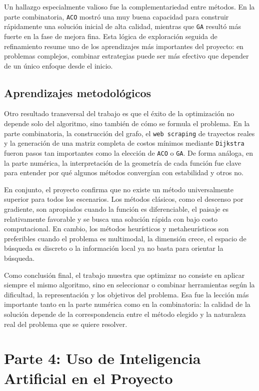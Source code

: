 \documentclass[
  12pt,
  letterpaper,
  DIV=11,
  numbers=noendperiod]{scrartcl}
\begin{document}
Un hallazgo especialmente valioso fue la complementariedad entre
métodos. En la parte combinatoria, \texttt{ACO} mostró una muy buena
capacidad para construir rápidamente una solución inicial de alta
calidad, mientras que \texttt{GA} resultó más fuerte en la fase de
mejora fina. Esta lógica de exploración seguida de refinamiento resume
uno de los aprendizajes más importantes del proyecto: en problemas
complejos, combinar estrategias puede ser más efectivo que depender de
un único enfoque desde el inicio.

\subsection{Aprendizajes
metodológicos}\label{aprendizajes-metodoluxf3gicos}

Otro resultado transversal del trabajo es que el éxito de la
optimización no depende solo del algoritmo, sino también de cómo se
formula el problema. En la parte combinatoria, la construcción del
grafo, el \texttt{web\ scraping} de trayectos reales y la generación de
una matriz completa de costos mínimos mediante \texttt{Dijkstra} fueron
pasos tan importantes como la elección de \texttt{ACO} o \texttt{GA}. De
forma análoga, en la parte numérica, la interpretación de la geometría
de cada función fue clave para entender por qué algunos métodos
convergían con estabilidad y otros no.

En conjunto, el proyecto confirma que no existe un método universalmente
superior para todos los escenarios. Los métodos clásicos, como el
descenso por gradiente, son apropiados cuando la función es
diferenciable, el paisaje es relativamente favorable y se busca una
solución rápida con bajo costo computacional. En cambio, los métodos
heurísticos y metaheurísticos son preferibles cuando el problema es
multimodal, la dimensión crece, el espacio de búsqueda es discreto o la
información local ya no basta para orientar la búsqueda.

Como conclusión final, el trabajo muestra que optimizar no consiste en
aplicar siempre el mismo algoritmo, sino en seleccionar o combinar
herramientas según la dificultad, la representación y los objetivos del
problema. Esa fue la lección más importante tanto en la parte numérica
como en la combinatoria: la calidad de la solución depende de la
correspondencia entre el método elegido y la naturaleza real del
problema que se quiere resolver.

\section{Parte 4: Uso de Inteligencia Artificial en el
Proyecto}\label{parte-4-uso-de-inteligencia-artificial-en-el-proyecto}
\end{document}
